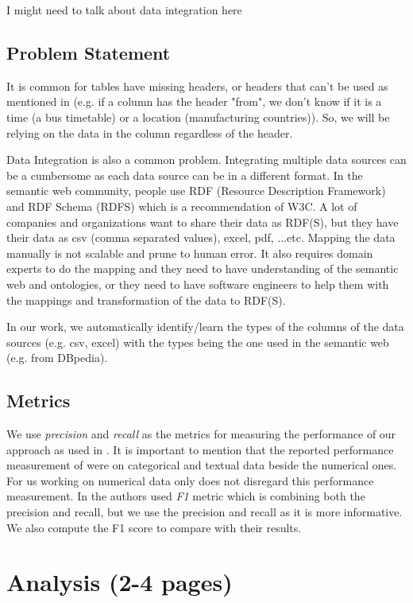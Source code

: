 \documentclass{article}
\newcommand{\comm}[2][inline]{\color{red} #2 \color{black}}
\begin{document}
\comm{I might need to talk about data integration here}

\subsection{Problem Statement}
It is common for tables have missing headers, or headers that can\rq t be used as mentioned in \cite{webtables-power-2008} (e.g. if a column has the header "from", we don\rq t know if it is a time (a bus timetable) or a location (manufacturing countries)). So, we will be relying on the data in the column regardless of the header. 

Data Integration is also a common problem. Integrating multiple data sources can be a cumbersome as each data source can be in a different format. In the semantic web community, people use RDF (Resource Description Framework) and RDF Schema (RDFS) which is a recommendation of W3C. A lot of companies and organizations want to share their data as RDF(S), but they have their data as csv (comma separated values), excel, pdf, ...etc. Mapping the data manually is not scalable and prune to human error. It also requires domain experts to do the mapping and they need to have understanding of the semantic web and ontologies, or they need to have software engineers to help them with the mappings and transformation of the data to RDF(S).

In our work, we automatically identify/learn the types of the columns of the data sources (e.g. csv, excel) with the types being the one used in the semantic web (e.g. from DBpedia\cite{dbpedia-site}).


\subsection{Metrics}
We use \textit{precision} and \textit{recall} as the metrics for measuring the performance of our approach as used in \cite{karma}. It is important to mention that the reported performance measurement of \cite{karma} were on categorical and textual data beside the numerical ones. For us working on numerical data only does not disregard this performance measurement. In \cite{ann-ser-webtables} the authors used \textit{F1} metric which is combining both the precision and recall, but we use the precision and recall as it is more informative. We also compute the F1 score to compare with their results.

\section{Analysis (2-4 pages)}
\end{document}
